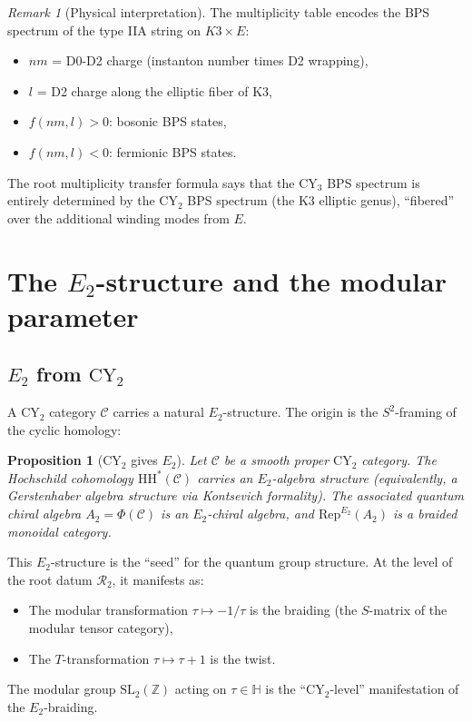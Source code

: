\documentclass[11pt]{article}
\theoremstyle{plain}
\newtheorem{proposition}[theorem]{Proposition}
\theoremstyle{definition}
\theoremstyle{remark}
\newtheorem{remark}[theorem]{Remark}
\newcommand{\CY}{\mathrm{CY}}
\newcommand{\HH}{\mathrm{HH}}
\newcommand{\Rep}{\mathrm{Rep}}
\newcommand{\Etwo}{E_2}
\newcommand{\cC}{\mathcal{C}}
\newcommand{\cR}{\mathcal{R}}
\begin{document}
\begin{remark}[Physical interpretation]
\label{rmk:physical-interp}
The multiplicity table encodes the BPS spectrum of the type IIA string on
$K3 \times E$:
\begin{itemize}
\item $nm$ = D0-D2 charge (instanton number times D2 wrapping),
\item $l$ = D2 charge along the elliptic fiber of K3,
\item $f(nm, l) > 0$: bosonic BPS states,
\item $f(nm, l) < 0$: fermionic BPS states.
\end{itemize}
The root multiplicity transfer formula says that the $\CY_3$ BPS spectrum is
entirely determined by the $\CY_2$ BPS spectrum (the K3 elliptic genus),
``fibered'' over the additional winding modes from $E$.
\end{remark}

\section{The $\Etwo$-structure and the modular parameter}
\label{sec:fib-e2}

\subsection{$\Etwo$ from $\CY_2$}
\label{subsec:e2-from-cy2}

A $\CY_2$ category $\cC$ carries a natural $\Etwo$-structure. The origin is
the $S^2$-framing of the cyclic homology:

\begin{proposition}[$\CY_2$ gives $\Etwo$]
\label{prop:cy2-e2}
Let $\cC$ be a smooth proper $\CY_2$ category. The Hochschild cohomology
$\HH^*(\cC)$ carries an $\Etwo$-algebra structure (equivalently, a
Gerstenhaber algebra structure via Kontsevich formality). The associated
quantum chiral algebra $A_2 = \Phi(\cC)$ is an $\Etwo$-chiral algebra, and
$\Rep^{\Etwo}(A_2)$ is a braided monoidal category.
\end{proposition}

This $\Etwo$-structure is the ``seed'' for the quantum group structure. At the
level of the root datum $\cR_2$, it manifests as:
\begin{itemize}
\item The modular transformation $\tau \mapsto -1/\tau$ is the braiding
 (the $S$-matrix of the modular tensor category),
\item The $T$-transformation $\tau \mapsto \tau + 1$ is the twist.
\end{itemize}
The modular group $\mathrm{SL}_2(\mathbb{Z})$ acting on $\tau \in \mathbb{H}$
is the ``$\CY_2$-level'' manifestation of the $\Etwo$-braiding.
\end{document}
